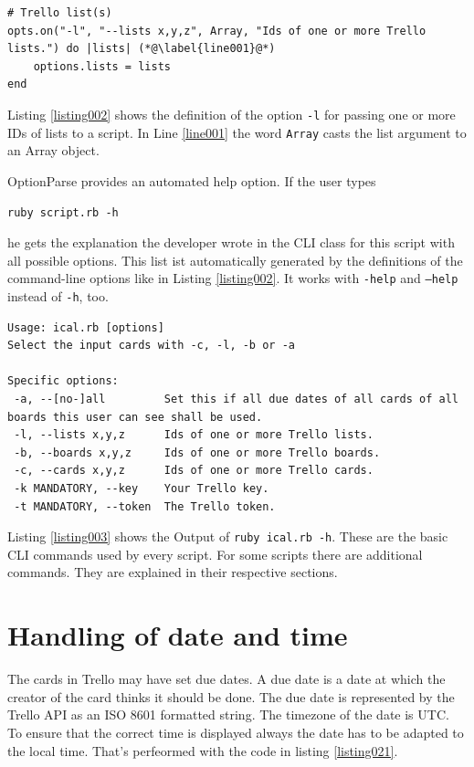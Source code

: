 \begin{lstlisting}[aboveskip=1\baselineskip, caption=Definition of a command-line option, label=listing002]
# Trello list(s)
opts.on("-l", "--lists x,y,z", Array, "Ids of one or more Trello lists.") do |lists| (*@\label{line001}@*)
	options.lists = lists
end
\end{lstlisting}

Listing \ref{listing002} shows the definition of the option \texttt{-l} for passing one or more IDs of lists to a script. In Line \ref{line001} the word \lstinline{Array} casts the list argument to an Array object.

OptionParse provides an automated help option. If the user types 
\begin{center}
\texttt{ruby script.rb -h} 
\end{center}
he gets the explanation the developer wrote in the CLI class for this script with all possible options. This list ist automatically generated by the definitions of the command-line options like in Listing \ref{listing002}. It works with \texttt{-help} and \texttt{--help} instead of \texttt{-h}, too.

\begin{lstlisting}[aboveskip=1\baselineskip, style=bash, caption=Output of the \texttt{-h} option., label=listing003]
Usage: ical.rb [options]
Select the input cards with -c, -l, -b or -a

Specific options:
 -a, --[no-]all         Set this if all due dates of all cards of all boards this user can see shall be used.
 -l, --lists x,y,z      Ids of one or more Trello lists.
 -b, --boards x,y,z     Ids of one or more Trello boards.
 -c, --cards x,y,z      Ids of one or more Trello cards.
 -k MANDATORY, --key    Your Trello key.
 -t MANDATORY, --token  The Trello token.
\end{lstlisting}

Listing \ref{listing003} shows the Output of \texttt{ruby ical.rb -h}. 
These are the basic CLI commands used by every script. For some scripts there are additional commands. They are explained in their respective sections.

\section{Handling of date and time}
The cards in Trello may have set due dates. A due date is a date at which the creator of the card thinks it should be done. The due date is represented by the Trello API as an ISO 8601 formatted string. The timezone of the date is UTC. To ensure that the correct time is displayed always the date has to be adapted to the local time. That's perfeormed with the code in listing \ref{listing021}.

